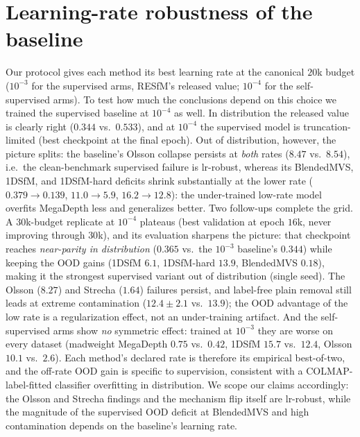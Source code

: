 \documentclass[10pt,twocolumn,letterpaper]{article}
\begin{document}
\section{Learning-rate robustness of the baseline}\label{app:lrgrid}\label{sec:lrgrid}
Our protocol gives each method its best learning rate at the canonical $20$k budget
($10^{-3}$ for the supervised arms, RESfM's released value; $10^{-4}$ for the
self-supervised arms). To test how much the conclusions depend on this choice we trained
the supervised baseline at $10^{-4}$ as well. In distribution the released value is
clearly right ($0.344$ vs.\ $0.533$), and at $10^{-4}$ the supervised model is
truncation-limited (best checkpoint at the final epoch). Out of distribution, however,
the picture splits: the baseline's Olsson collapse persists at \emph{both} rates
($8.47$ vs.\ $8.54$), i.e.\ the clean-benchmark supervised failure is lr-robust,
whereas its BlendedMVS, 1DSfM, and 1DSfM-hard deficits shrink substantially at the lower
rate ($0.379\!\to\!0.139$, $11.0\!\to\!5.9$, $16.2\!\to\!12.8$): the
under-trained low-rate model overfits MegaDepth less and generalizes better. Two follow-ups
complete the grid. A $30$k-budget replicate at $10^{-4}$ plateaus (best validation at
epoch $16$k, never improving through $30$k), and its evaluation sharpens the picture:
that checkpoint reaches \emph{near-parity in distribution} ($0.365$ vs.\ the $10^{-3}$
baseline's $0.344$) while keeping the OOD gains (1DSfM $6.1$, 1DSfM-hard $13.9$,
BlendedMVS $0.18$), making it the strongest supervised variant out of distribution
(single seed). The Olsson ($8.27$) and Strecha ($1.64$) failures persist, and label-free
plain removal still leads at extreme contamination ($12.4\pm2.1$ vs.\ $13.9$); the OOD
advantage of the low rate is a regularization effect, not an under-training artifact. And the self-supervised
arms show \emph{no} symmetric effect: trained at $10^{-3}$ they are worse on every
dataset (madweight MegaDepth $0.75$ vs.\ $0.42$, 1DSfM $15.7$ vs.\ $12.4$, Olsson
$10.1$ vs.\ $2.6$). Each method's declared rate is therefore its empirical best-of-two,
and the off-rate OOD gain is specific to supervision, consistent with a
COLMAP-label-fitted classifier overfitting in distribution. We scope our claims
accordingly: the Olsson and Strecha findings and the mechanism flip itself are
lr-robust, while the magnitude of the supervised OOD deficit at BlendedMVS and high
contamination depends on the baseline's learning rate.
\end{document}
